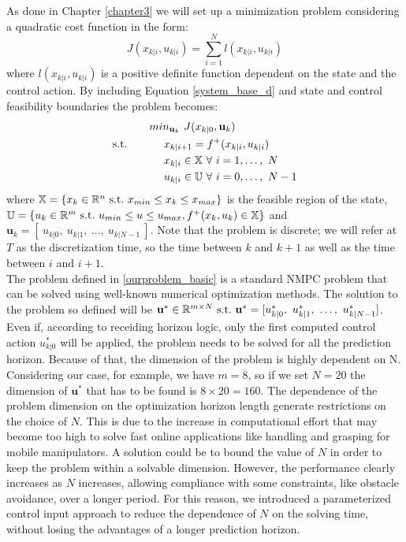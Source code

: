 As done in Chapter \ref{chapter3} we will set up a minimization problem considering a quadratic cost function in the form:
\begin{equation}\label{J_continua}
J({x}_{k|i},{u}_{k|i})=\sum_{i=1}^{N}l({x}_{k|i},{u}_{k|i})
\end{equation} 
where $l({x}_{k|i},{u}_{k|i})$ is a positive definite function dependent on the state and the control action. By including Equation \ref{system_base_d} and state and control feasibility boundaries the problem becomes: 
\begin{equation} \label{ourproblem_basic}
\begin{split}
		& min_{\textbf{u}_k}\ J({x}_{k|0},\textbf{u}_{k}) \\
		\textnormal{s.t.}\qquad
		&\ \ \ \ x_{k|i+1}=f^+(x_{k|i},u_{k|i}) \\
		&\ \ \ \ {x}_{k|i} \in \mathbb{X}\ \forall\ i=1,\dots,\ N  \\
		&\ \ \ \ {u}_{k|i} \in \mathbb{U}\ \forall\ i=0,\dots,\ N-1 \\
	\end{split}	
\end{equation}
where $\mathbb{X} = \lbrace {x_k}\in \mathbb{R}^n\ \textnormal{s.t.}\ {x}_{min}\leq x_k\leq x_{max} \rbrace$ is the feasible region of the state, $\mathbb{U} = \lbrace {u_k}\in \mathbb{R}^m\ \textnormal{s.t.}\ {u}_{min}\leq{u}\leq{u}_{max}, f^+(x_k,u_k) \in \mathbb{X} \rbrace $ and $\textbf{u}_k=[\ u_{k|0},\ u_{k|1},\ \dots,\ u_{k|N-1}\ ]$.
Note that the problem is discrete; we will refer at $T$ as the discretization time, so the time between $k$ and $k+1$ as well as the time between $i$ and $i+1$. \\
The problem defined in \ref{ourproblem_basic} is a standard NMPC problem that can be solved using well-known numerical optimization methods. The solution to the problem so defined will be $\textbf{u}^* \in \mathbb{R}^{m\times N}\ \textnormal{s.t.}\ \textbf{u}^* =[{u}^*_{k|0},\ {u}^*_{k|1},\ \dots,\ {u}^*_{k|N-1}]$. Even if, according to receiding horizon logic, only the first computed control action ${u}^*_{k|0}$ will be applied, the problem needs to be solved for all the prediction horizon. Because of that, the dimension of the problem is highly dependent on N. Considering our case, for example, we have $m=8$, so if we set $N=20$ the dimension of $\textbf{u}^*$ that has to be found is $8\times20=160$. The dependence of the problem dimension on the optimization horizon length generate restrictions on the choice of $N$. This is due to the increase in computational effort that may become too high to solve fast online applications like handling and grasping for mobile manipulators. A solution could be to bound the value of $N$ in order to keep the problem within a solvable dimension. However, the performance clearly increases as $N$ increases, allowing compliance with some constraints, like obstacle avoidance, over a longer period. For this reason, we introduced a parameterized control input approach to reduce the dependence of $N$ on the solving time, without losing the advantages of a longer prediction horizon.

